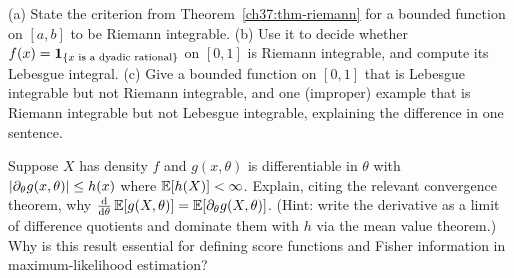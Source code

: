 \begin{exercise}
\label{ch37:ex-riemann}
(a) State the criterion from Theorem~\ref{ch37:thm-riemann} for a bounded
function on $[a,b]$ to be Riemann integrable. (b) Use it to decide whether
$f(x)=\mathbf{1}_{\{x \text{ is a dyadic rational}\}}$ on $[0,1]$ is Riemann
integrable, and compute its Lebesgue integral. (c) Give a bounded function on
$[0,1]$ that is Lebesgue integrable but not Riemann integrable, and one
(improper) example that is Riemann integrable but not Lebesgue integrable,
explaining the difference in one sentence.
\end{exercise}

\begin{exercise}
\label{ch37:ex-diffunder}
Suppose $X$ has density $f$ and $g(x,\theta)$ is differentiable in $\theta$ with
$\lvert\partial_\theta g(x,\theta)\rvert\le h(x)$ where $\operatorname{\mathbb{E}}[h(X)]<\infty$. Explain,
citing the relevant convergence theorem, why
$\frac{\mathrm{d}}{\mathrm{d}\theta}\operatorname{\mathbb{E}}[g(X,\theta)]=\operatorname{\mathbb{E}}[\partial_\theta g(X,\theta)]$. (Hint:
write the derivative as a limit of difference quotients and dominate them with
$h$ via the mean value theorem.) Why is this result essential for defining score
functions and Fisher information in maximum-likelihood estimation?
\end{exercise}
